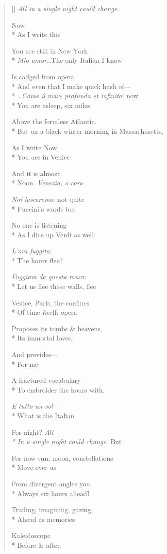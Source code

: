 \label{ch:e_tutto}
\settowidth{\versewidth}{But on a black winter morning in Massachusetts,}
\begin{verse}[\versewidth]
\textit{All in a single night could change.}

Now\\*
As I write this

You are still in New York\\*
\textit{Mio amor}\ldots The only Italian I know

Is cadged from opera\\*
And even that I make quick hash of---\\*
\ldots \textit{Come il mare profunda et infinita}: now\\*
You are asleep, six miles

Above the formless Atlantic.\\*
But on a black winter morning in Massachusetts,

As I write Now,\\*
You are in Venice

And it is almost\\*
Noon. \textit{Venezia, o cara}

\textit{Noi lasceremo}: not quite\\*
Puccini's words but

No one is listening\\*
As I dice up Verdi as well:

\textit{L'ora fuggita}:\\*
The hours flee?  

\textit{Fuggiam da questa mura}:\\*
Let us flee these walls, flee

Venice, Paris, the confines\\*
Of time itself: opera

Proposes its tombs \& heavens,\\*
Its immortal loves,

And provides---\\*
For me---

A fractured vocabulary\\*
To embroider the hours with.

\textit{E tutto un sol}---\\*
What is the Italian

For night? \textit{All\\*
In a single night could change}. But

For now sun, moon, constellations\\*
Move over us

From divergent angles \qquad you\\*
Always six hours ahead\qquad I

Trailing, imagining, gazing\\*
Ahead as memories

Kaleidoscope\\*
Before \& after.
\end{verse}

